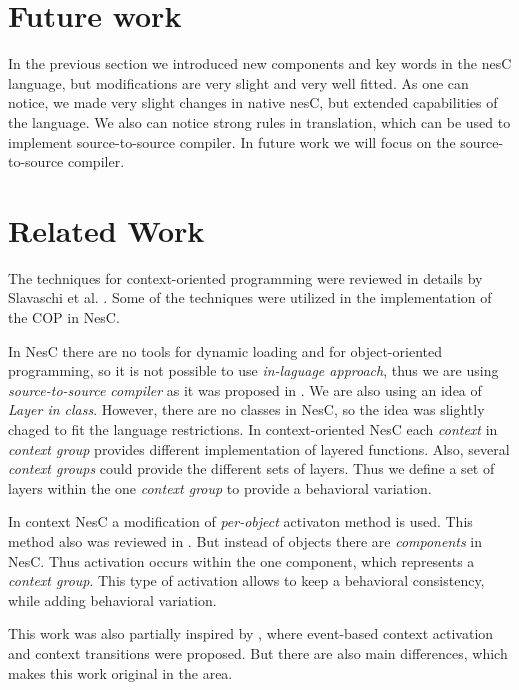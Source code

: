 \documentclass{ubicomp-ext}
\begin{document}
\section{Future work}
In the previous section we introduced new components and key words in the nesC language, but modifications are very slight and very well fitted. As one can notice, we made very slight changes in native nesC, but extended capabilities of the language. We also can notice strong rules in translation, which can be used to implement source-to-source compiler. In future work we will focus on the source-to-source compiler.

\section{Related Work}
The techniques for context-oriented programming were reviewed in details by Slavaschi et al. \cite{salvaneschi12}. Some of the techniques were utilized in the implementation of the COP in NesC.

In NesC there are no tools for dynamic loading and for object-oriented programming, so it is not possible to use \textit{in-laguage approach}, thus we are using \textit{source-to-source compiler} as it was proposed in \cite{salvaneschi12}. We are also using an idea of \textit{Layer in class}\cite{salvaneschi12}. However, there are no classes in NesC, so the idea was slightly chaged to fit the language restrictions. In context-oriented NesC each \textit{context} in \textit{context group} provides different implementation of layered functions. Also, several \textit{context groups} could provide the different sets of layers. Thus we define a set of layers within the one \textit{context group} to provide a behavioral variation.

In context NesC a modification of \textit{per-object} activaton method is used. This method also was reviewed in \cite{salvaneschi12}. But instead of objects there are \textit{components} in NesC. Thus activation occurs within the one component, which represents a \textit{context group}. This type of activation allows to keep a behavioral consistency, while adding behavioral variation.

This work was also partially inspired by \cite{kamina11}, where event-based context activation and context transitions were proposed. But there are also main differences, which makes this work original in the area.
\end{document}
